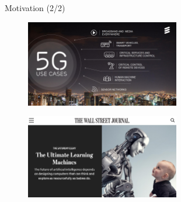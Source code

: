 \documentclass{beamer}
\begin{document}
\begin{frame}{Motivation (2/2)}
\begin{figure}
    \centering
    \includegraphics[width = 0.6\textwidth]{Ericsson.PNG}
    \label{fig:1}
\end{figure}
\begin{figure}
    \centering
    \includegraphics[width = 0.6\textwidth]{WSJ_4.PNG}
    \label{fig:1}
\end{figure}
\end{frame}
\end{document}
